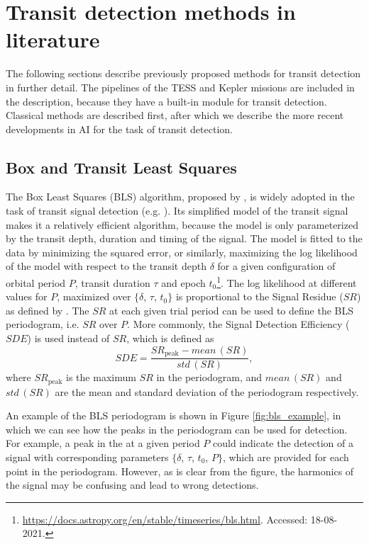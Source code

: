 
\section{Transit detection methods in literature}
\label{sec:detection_lit}

The following sections describe previously proposed methods for transit detection in further detail. The pipelines of the TESS and Kepler missions are included in the description, because they have a built-in module for transit detection. Classical methods are described first, after which we describe the more recent developments in AI for the task of transit detection.

\subsection{Box and Transit Least Squares}

The Box Least Squares (BLS) algorithm, proposed by \cite{kovacs2002box}, is widely adopted in the task of transit signal detection (e.g. \citealp{kunimoto2020searching, rizzuto2020tess}). Its simplified model of the transit signal makes it a relatively efficient algorithm, because the model is only parameterized by the transit depth, duration and timing of the signal. The model is fitted to the data by minimizing the squared error, or similarly, maximizing the log likelihood of the model with respect to the transit depth $\delta$ for a given configuration of orbital period $P$, transit duration $\tau$ and epoch $t_0$\footnote{\url{https://docs.astropy.org/en/stable/timeseries/bls.html}. Accessed: 18-08-2021.}. The log likelihood at different values for $P$, maximized over $\{\delta$, $\tau$, $t_0\}$ is proportional to the Signal Residue ($SR$) as defined by \cite{kovacs2002box}. The $SR$ at each given trial period can be used to define the BLS periodogram, i.e. $SR$ over $P$. More commonly, the Signal Detection Efficiency ($SDE$) is used instead of $SR$, which is defined as
\begin{equation}
    SDE = \frac{SR_{\text{peak}} - \textit{mean}\,(SR)} {\textit{std}\,(SR)},
\end{equation}
where $SR_{\text{peak}}$ is the maximum $SR$ in the periodogram, and $\textit{mean}\,(SR)$ and $\textit{std}\,(SR)$ are the mean and standard deviation of the periodogram respectively.

An example of the BLS periodogram is shown in Figure \ref{fig:bls_example}, in which we can see how the peaks in the periodogram can be used for detection. For example, a peak in the at a given period $P$ could indicate the detection of a signal with corresponding parameters $\{\delta$, $\tau$, $t_0$, $P\}$, which are provided for each point in the periodogram. However, as is clear from the figure, the harmonics of the signal may be confusing and lead to wrong detections.

